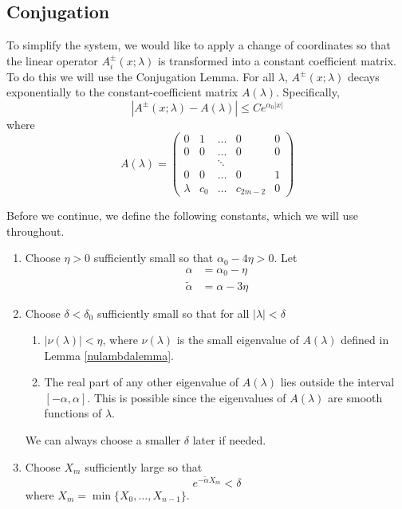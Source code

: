 \documentclass[thesis.tex]{subfiles}
\begin{document}
\subsection{Conjugation}

To simplify the system, we would like to apply a change of coordinates so that the linear operator $A_i^\pm(x; \lambda)$ is transformed into a constant coefficient matrix. To do this we will use the Conjugation Lemma. For all $\lambda$, $A^\pm(x; \lambda)$ decays exponentially to the constant-coefficient matrix $A(\lambda)$. Specifically, 
\[
|A^\pm(x; \lambda) - A(\lambda)| \leq C e^{\alpha_0 |x|}
\]
where
\begin{equation}\label{Alambda}
A(\lambda) = \begin{pmatrix}
0 & 1 & \dots & 0 & 0 \\
0 & 0 & \dots & 0 & 0 \\
& & \ddots  \\
0 & 0 & \dots & 0 & 1 \\
\lambda & c_0 & \dots & c_{2m-2} & 0
\end{pmatrix}
\end{equation}

Before we continue, we define the following constants, which we will use throughout.
\begin{enumerate}
	\item Choose $\eta > 0$ sufficiently small so that $\alpha_0 - 4 \eta > 0$. Let
	\begin{align*}
	\alpha &= \alpha_0 - \eta \\
	\tilde{\alpha} &= \alpha - 3 \eta
	\end{align*}

	\item Choose $\delta < \delta_0$ sufficiently small so that for all $|\lambda| < \delta$
	\begin{enumerate}
		\item $|\nu(\lambda)| < \eta$, where $\nu(\lambda)$ is the small eigenvalue of $A(\lambda)$ defined in Lemma \ref{nulambdalemma}.
		\item The real part of any other eigenvalue of $A(\lambda)$ lies outside the interval $[-\alpha, \alpha]$. This is possible since the eigenvalues of $A(\lambda)$ are smooth functions of $\lambda$.
	\end{enumerate}
	We can always choose a smaller $\delta$ later if needed.

	\item Choose $X_m$ sufficiently large so that
	\begin{equation}
	e^{-\tilde{\alpha} X_m} < \delta
	\end{equation}
	where $X_m = \min\{X_0, \dots, X_{n-1}\}$.
\end{enumerate}
\end{document}
